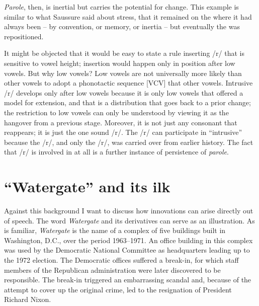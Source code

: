 \documentclass[output=paper,
modfonts
]{LSP/langsci}
\begin{document}
\emph{Parole}, then, is inertial but carries the potential for change.
This example is similar to what Saussure said about  stress, that
it remained on the  where it had always been -- by convention, or
memory, or inertia -- but eventually the  was repositioned.

It might be objected that it would be easy to state a rule inserting /r/
that is sensitive to vowel height; insertion would happen only in
position after low vowels. But why low vowels? Low vowels are not
universally more likely than other vowels to adopt a phonotactic
sequence {[}VCV{]} that other vowels. Intrusive /r/ develops only after
low vowels because it is only low vowels that offered a model for
 extension, and that is a distribution that goes back to a
prior change; the restriction to low vowels can only be understood by
viewing it as the hangover from a previous stage. Moreover, it is not
just any consonant that reappears; it is just the one sound /r/. The /r/
can participate in ``intrusive''  because the /r/, and only the
/r/, was carried over from earlier history. The fact that /r/ is
involved in  at all is a further instance of persistence of
\emph{parole}.

\section{{``Watergate''} and its ilk}

Against this background I want to discuss how innovations can arise
directly out of speech. The word \emph{Watergate} and its derivatives
can serve as an illustration. As is familiar, \emph{Watergate} is the
name of a complex of five buildings built in Washington, D.C., over the
period 1963--1971. An office building in this complex was used by the
Democratic National Committee as headquarters leading up to the 1972
election. The Democratic offices suffered a break-in, for which staff
members of the Republican administration were later discovered to be
responsible. The break-in triggered an embarrassing scandal and, because
of the attempt to cover up the original crime, led to the resignation of
President Richard Nixon.
\end{document}
